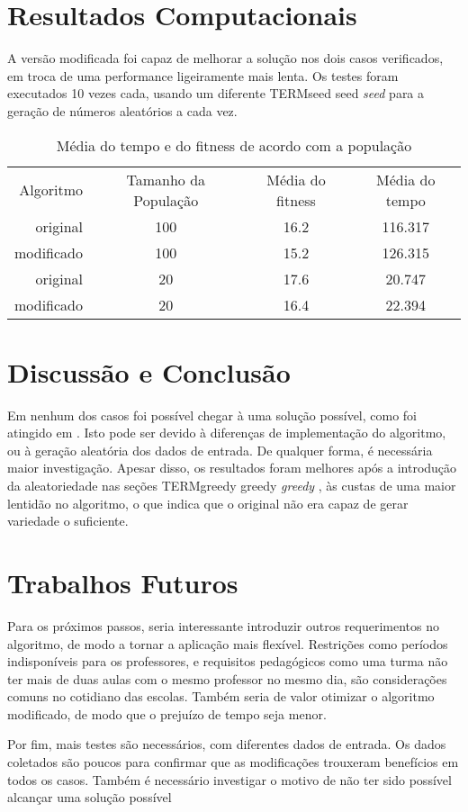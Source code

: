\documentclass{article}
\def\foreign#1{%
  \ifcsname TERM#1\endcsname%
  #1%
  \else%
  \emph{#1}%
  \expandafter\gdef\csname TERM#1\endcsname{}%
\fi}
\begin{document}
\section{Resultados Computacionais}
A versão modificada foi capaz de melhorar a solução nos dois casos verificados,
em troca de uma performance ligeiramente mais lenta. Os testes foram executados
10 vezes cada, usando um diferente \foreign{seed} para a geração de números
aleatórios a cada vez.

\begin{table}
  \caption{Média do tempo e do fitness de acordo com a população}
  \centering
  \begin{tabular}{ r c c c }
    Algoritmo & Tamanho da População & Média do fitness & Média do tempo \\
     original & 100 & 16.2 & 116.317 \\
   modificado & 100 & 15.2 & 126.315 \\
     original &  20 & 17.6 & 20.747 \\
   modificado &  20 & 16.4 & 22.394 \\
  \end{tabular}
\end{table}

\section{Discussão e Conclusão}
Em nenhum dos casos foi possível chegar à uma solução possível, como foi
atingido em \cite{Raghavjee:2008:GASTP}. Isto pode ser devido à diferenças de
implementação do algoritmo, ou à geração aleatória dos dados de entrada. De
qualquer forma, é necessária maior investigação. Apesar disso, os resultados
foram melhores após a introdução da aleatoriedade nas seções \foreign{greedy},
às custas de uma maior lentidão no algoritmo, o que indica que o original não
era capaz de gerar variedade o suficiente.

\section{Trabalhos Futuros}
Para os próximos passos, seria interessante introduzir outros requerimentos no
algoritmo, de modo a tornar a aplicação mais flexível. Restrições como períodos
indisponíveis para os professores, e requisitos pedagógicos como uma turma não
ter mais de duas aulas com o mesmo professor no mesmo dia, são considerações
comuns no cotidiano das escolas. Também seria de valor otimizar o algoritmo
modificado, de modo que o prejuízo de tempo seja menor.

Por fim, mais testes são necessários, com diferentes dados de entrada. Os dados
coletados são poucos para confirmar que as modificações trouxeram benefícios em
todos os casos. Também é necessário investigar o motivo de não ter sido possível
alcançar uma solução possível



\end{document}
